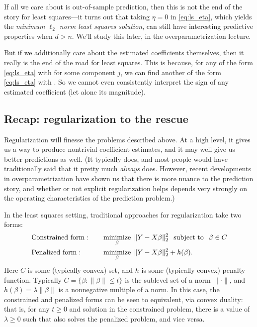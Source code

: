 \documentclass{article}
\begin{document}
If all we care about is out-of-sample prediction, then this is not the end of
the story for least squares---it turns out that taking $\eta=0$ in
\eqref{eq:ls_eta}, which yields the \emph{minimum $\ell_2$ norm least squares
  solution}, can still have interesting predictive properties when $d>n$. We'll
study this later, in the overparametrization lecture.   

But if we additionally care about the estimated coefficients themselves, then it
really is the end of the road for least squares. This is because, for any
\smash{$\hbeta$} of the form \eqref{eq:ls_eta} with  for
some component $j$, we can find another \smash{$\tilde\beta$} of the form
\eqref{eq:ls_eta} with . So we cannot even
consistently interpret the sign of any estimated coefficient (let alone its 
magnitude). 

\subsection{Recap: regularization to the rescue}

Regularization will finesse the problems described above. At a high level, it
gives us a way to produce nontrivial coefficient estimates, and it may well give 
us better predictions as well. (It typically does, and most people would have
traditionally said that it pretty much \emph{always} does. However, recent
developments in overparametrization have shown us that there is more nuance to 
the prediction story, and whether or not explicit regularization helps depends
very strongly on the operating characteristics of the prediction problem.) 

In the least squares setting, traditional approaches for regularization take two
forms:  
\begin{alignat*}{3}
&\text{Constrained form}: \quad 
&&\mathop{\mathrm{minimize}}_\beta \; \|Y - X\beta\|_2^2 \;\; \mathop{\mathrm{subject\,\,to}} \;\; \beta \in C \\
&\text{Penalized form}: \quad 
&&\mathop{\mathrm{minimize}}_\beta \; \|Y - X\beta\|_2^2 + h(\beta).
\end{alignat*}
Here $C$ is some (typically convex) set, and $h$ is some (typically convex)
penalty function. Typically $C = \{\beta : \|\beta\| \leq t\}$ is the sublevel
set of a norm $\|\cdot\|$, and $h(\beta) = \lambda \|\beta\|$ is a nonnegative
multiple of a norm. In this case, the constrained and penalized forms can be 
seen to equivalent, via convex duality: that is, for any $t \geq 0$ and solution 
\smash{$\hbeta$} in the constrained problem, there is a value of $\lambda \geq
0$ such that \smash{$\hbeta$} also solves the penalized problem, and vice
versa. 
\end{document}
